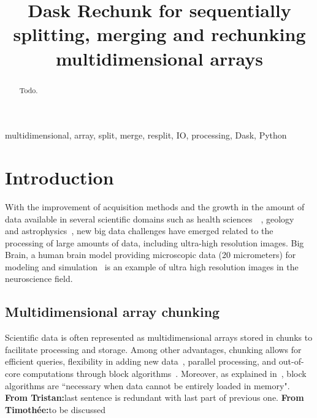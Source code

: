 \documentclass[conference]{IEEEtran}
\newcommand{\tristan}[1]{\color{orange}\textbf{From Tristan:}#1\color{black}}
\newcommand{\timothee}[1]{\color{blue}\textbf{From Timothée:}#1\color{black}}
\begin{document}
\title{ Dask Rechunk for sequentially splitting, merging and rechunking multidimensional arrays }

\author{
}

\maketitle

\begin{abstract}
Todo.
\end{abstract}

\begin{IEEEkeywords}
multidimensional, array, split, merge, resplit, IO, processing, Dask, Python
\end{IEEEkeywords}

\section{Introduction}
With the improvement of acquisition methods and the growth in the amount of data
available in several scientific domains such as health
sciences~\cite{bigdata_health}~\cite{Amunts1472}, geology~\cite{big_data_geology}
and astrophysics~\cite{biguniverse}, new big data challenges have emerged related
to the processing of large amounts of data, including ultra-high resolution
images. Big Brain, a human brain model providing microscopic data (20 micrometers) for
modeling and simulation~\cite{Amunts1472} is an example of ultra high resolution
images in the neuroscience field.

\subsection{Multidimensional array chunking}
Scientific data is often represented as multidimensional arrays stored in
chunks to facilitate processing and storage. Among other advantages, chunking
allows for efficient queries, flexibility in adding new
data~\cite{optimal_chuking}, parallel processing, and out-of-core
computations through block algorithms~\cite{matthew_rocklin-proc-scipy-2015}.
Moreover, as explained in~\cite{matthew_rocklin-proc-scipy-2015}, block
algorithms are ``necessary when data cannot be entirely loaded in memory".
\tristan{last sentence is redundant with last part of previous one.}
\timothee{to be discussed}
\end{document}
